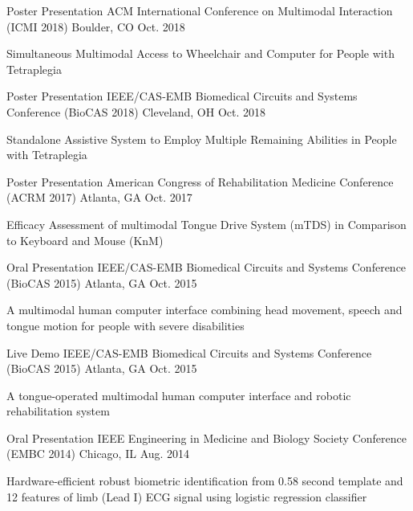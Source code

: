 \begin{cventries}
    \cventry
    {Poster Presentation}
    {ACM International Conference on Multimodal Interaction (ICMI 2018)}
    {Boulder, CO}
    {Oct. 2018}
    {
      \begin{cvitems}
        \item {Simultaneous Multimodal Access to Wheelchair and Computer for People with Tetraplegia}
      \end{cvitems}
    }
    \cventry
    {Poster Presentation}
    {IEEE/CAS-EMB Biomedical Circuits and Systems Conference (BioCAS 2018)}
    {Cleveland, OH}
    {Oct. 2018}
    {
      \begin{cvitems}
        \item {Standalone Assistive System to Employ Multiple Remaining Abilities in People with Tetraplegia}
      \end{cvitems}
    }
    \cventry
    {Poster Presentation}
    {American Congress of Rehabilitation Medicine Conference (ACRM 2017)}
    {Atlanta, GA}
    {Oct. 2017}
    {
      \begin{cvitems}
        \item {Efficacy Assessment of multimodal Tongue Drive System (mTDS) in Comparison to Keyboard and Mouse (KnM)}
      \end{cvitems}
    }
  \cventry
    {Oral Presentation}
    {IEEE/CAS-EMB Biomedical Circuits and Systems Conference (BioCAS 2015)}
    {Atlanta, GA}
    {Oct. 2015}
    {
      \begin{cvitems}
        \item {A multimodal human computer interface combining head movement, speech and tongue motion for people with severe disabilities}
      \end{cvitems}
    }
    \cventry
    {Live Demo}
    {IEEE/CAS-EMB Biomedical Circuits and Systems Conference (BioCAS 2015)}
    {Atlanta, GA}
    {Oct. 2015}
    {
      \begin{cvitems}
        \item { A tongue-operated multimodal human computer interface and robotic rehabilitation system}
      \end{cvitems}
    }
    \cventry
    {Oral Presentation}
    {IEEE Engineering in Medicine and Biology Society Conference (EMBC 2014)}
    {Chicago, IL}
    {Aug. 2014}
    {
      \begin{cvitems}
        \item {Hardware-efficient robust biometric identification from 0.58 second template and 12 features of limb (Lead I) ECG signal using logistic regression classifier}

\end{cvitems}}
\end{cventries}
